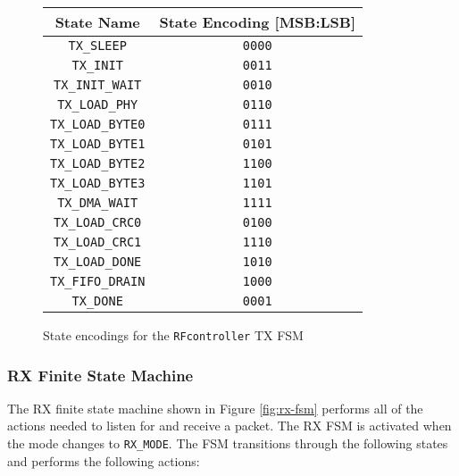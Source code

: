 \begin{figure}
	\centering
	\begin{tabular}{|c|c|}
		\hline
		State Name & State Encoding [MSB:LSB] \\
		\hline
		\texttt{TX\_SLEEP} & \texttt{0000} \\
		\texttt{TX\_INIT} & \texttt{0011} \\
		\texttt{TX\_INIT\_WAIT} & \texttt{0010} \\
		\texttt{TX\_LOAD\_PHY} & \texttt{0110} \\
		\texttt{TX\_LOAD\_BYTE0} & \texttt{0111} \\
		\texttt{TX\_LOAD\_BYTE1} & \texttt{0101} \\
		\texttt{TX\_LOAD\_BYTE2} & \texttt{1100} \\
		\texttt{TX\_LOAD\_BYTE3} & \texttt{1101} \\
		\texttt{TX\_DMA\_WAIT} & \texttt{1111} \\
		\texttt{TX\_LOAD\_CRC0} & \texttt{0100} \\
		\texttt{TX\_LOAD\_CRC1} & \texttt{1110} \\
		\texttt{TX\_LOAD\_DONE} & \texttt{1010} \\
		\texttt{TX\_FIFO\_DRAIN} & \texttt{1000} \\
		\texttt{TX\_DONE} & \texttt{0001} \\
		\hline
	\end{tabular}
	\caption{State encodings for the \texttt{RFcontroller} TX FSM}
	\label{table:tx-states}
\end{figure}

\subsubsection{RX Finite State Machine}
The RX finite state machine shown in Figure \ref{fig:rx-fsm} performs all of the actions needed to listen for and receive a packet. The RX FSM is activated when the mode changes to \texttt{RX\_MODE}. The FSM transitions through the following states and performs the following actions:

